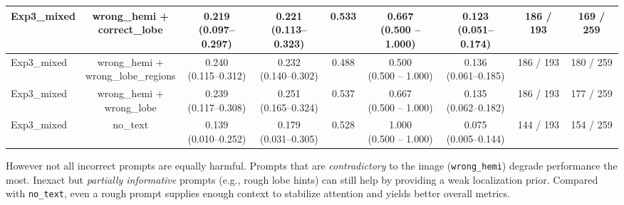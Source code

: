 \documentclass[a4paper,12pt]{article}
\begin{document}
\begin{table}[h]
\begin{tabular}{lcccccccc}
\hline
Exp3\_mixed & 
\makecell{wrong\_hemi + \\ correct\_lobe} &
\makecell{0.219 \\ (0.097--0.297)} &
\makecell{0.221 \\ (0.113--0.323)} &
\colorbox{blue!20}{0.533} &
\makecell{0.667 \\ (0.500 -- 1.000)} &
\makecell{0.123 \\ (0.051--0.174)} &
186 / 193 &
169 / 259 \\
\hline
Exp3\_mixed & \makecell{wrong\_hemi + \\ wrong\_lobe\_regions} &
\makecell{\colorbox{green!20}{0.240} \\ (0.115--0.312)} &
\makecell{0.232 \\ (0.140--0.302)} &
0.488 &
\makecell{0.500 \\ (0.500 -- 1.000)} &
\makecell{\colorbox{green!20}{0.136} \\ (0.061--0.185)} &
186 / 193 &
\colorbox{green!20}{180 / 259} \\
\hline
Exp3\_mixed & \makecell{wrong\_hemi + \\ wrong\_lobe} &
\makecell{\colorbox{blue!20}{0.239} \\ (0.117--0.308)} &
\makecell{\colorbox{green!20}{0.251} \\ (0.165--0.324)} &
\colorbox{green!20}{0.537} &
\makecell{0.667 \\ (0.500 -- 1.000)} &
\makecell{\colorbox{blue!20}{0.135} \\ (0.062--0.182)} &
186 / 193 &
\colorbox{blue!20}{177 / 259} \\
\hline
Exp3\_mixed & no\_text &
\makecell{0.139 \\ (0.010--0.252)} &
\makecell{0.179 \\ (0.031--0.305)} &
\colorbox{orange!20}{0.528} &
\makecell{1.000 \\ (0.500 -- 1.000)} &
\makecell{0.075 \\ (0.005--0.144)} &
144 / 193 &
154 / 259 \\
\hline
\end{tabular}
\end{table}

However not all incorrect prompts are equally harmful. Prompts that are \emph{contradictory} to the image (\texttt{wrong\_hemi}) degrade performance the most. Inexact but \emph{partially informative} prompts (e.g., rough lobe hints) can still help by providing a weak localization prior. Compared with \texttt{no\_text}, even a rough prompt supplies enough context to stabilize attention and yields better overall metrics.
\end{document}
